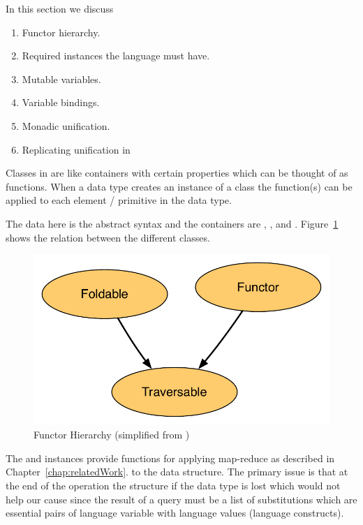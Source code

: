 \documentclass[thesis-solanki.tex]{subfiles}
\begin{document}
In this section we discuss
\begin{enumerate}
\item Functor hierarchy.

\item Required instances the language must have.

\item Mutable variables.

\item Variable bindings.

\item Monadic unification.

\item Replicating  unification in 
\end{enumerate}

Classes in  are like containers with certain properties which can be thought of as functions.
When a data type creates an instance of a class the function(s) can be applied to each element / primitive in the
data type.


The data here is the  abstract syntax and the containers are
, , and .
Figure~\ref{fig:Functor Hierarchy} shows the relation between the different classes.

\begin{figure}[th]
\centering
\includegraphics[scale = 0.7]{FunctorHierarchy.pdf}
\caption{Functor Hierarchy (simplified from \cite{website:foldablenadtraversable})}
\label{fig:Functor Hierarchy}
\end{figure}

The  and  instances provide functions for applying map-reduce as described in Chapter~\ref{chap:relatedWork}.
to the data structure.
The primary issue is that at the end of the operation the structure if the data type is lost which would not help
our cause since the result of a query must be a list of substitutions which are essential pairs of language
variable with language values (language constructs).
\end{document}
